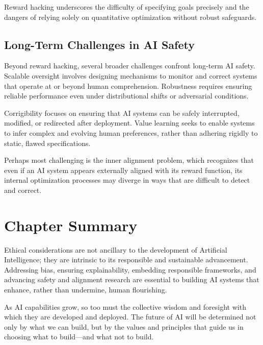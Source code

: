\documentclass[openany]{book}
\begin{document}
Reward hacking underscores the difficulty of specifying goals precisely and the
dangers of relying solely on quantitative optimization without robust
safeguards.

\subsection{Long-Term Challenges in AI Safety}

Beyond reward hacking, several broader challenges confront long-term AI safety.
Scalable oversight involves designing mechanisms to monitor and correct systems
that operate at or beyond human comprehension. Robustness requires ensuring
reliable performance even under distributional shifts or adversarial conditions.

Corrigibility focuses on ensuring that AI systems can be safely interrupted,
modified, or redirected after deployment. Value learning seeks to enable systems
to infer complex and evolving human preferences, rather than adhering rigidly to
static, flawed specifications.

Perhaps most challenging is the inner alignment problem, which recognizes that
even if an AI system appears externally aligned with its reward function, its
internal optimization processes may diverge in ways that are difficult to detect
and correct.

\section{Chapter Summary}

Ethical considerations are not ancillary to the development of Artificial
Intelligence; they are intrinsic to its responsible and sustainable advancement.
Addressing bias, ensuring explainability, embedding responsible frameworks, and
advancing safety and alignment research are essential to building AI systems
that enhance, rather than undermine, human flourishing.

As AI capabilities grow, so too must the collective wisdom and foresight with
which they are developed and deployed. The future of AI will be determined not
only by what we can build, but by the values and principles that guide us in
choosing what to build---and what not to build.
\end{document}
